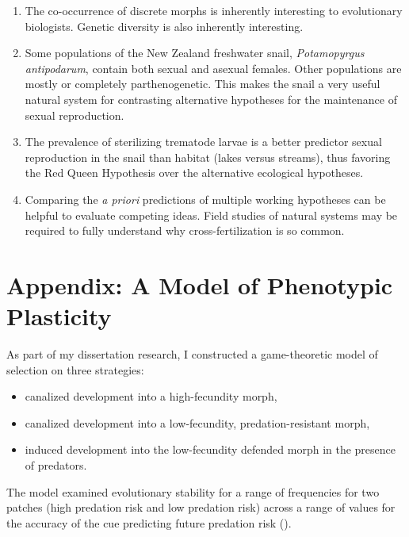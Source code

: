 \documentclass[
  american,
  letterpaper,
]{book}
\providecommand{\tightlist}{%
  \setlength{\itemsep}{0pt}\setlength{\parskip}{0pt}}\usepackage{longtable,booktabs,array}
\begin{document}
\begin{enumerate}
\def\labelenumi{\arabic{enumi}.}
\tightlist
\item
  The co-occurrence of discrete morphs is inherently interesting to
  evolutionary biologists. Genetic diversity is also inherently
  interesting.
\item
  Some populations of the New Zealand freshwater snail,
  \emph{Potamopyrgus antipodarum}, contain both sexual and asexual
  females. Other populations are mostly or completely parthenogenetic.
  This makes the snail a very useful natural system for contrasting
  alternative hypotheses for the maintenance of sexual reproduction.
\item
  The prevalence of sterilizing trematode larvae is a better predictor
  sexual reproduction in the snail than habitat (lakes versus streams),
  thus favoring the Red Queen Hypothesis over the alternative ecological
  hypotheses.
\item
  Comparing the \emph{a priori} predictions of multiple working
  hypotheses can be helpful to evaluate competing ideas. Field studies
  of natural systems may be required to fully understand why
  cross-fertilization is so common.
\end{enumerate}

\section{Appendix: A Model of Phenotypic Plasticity}\label{sec-app-3}

As part of my dissertation research, I constructed a game-theoretic
model of selection on three strategies:

\begin{itemize}
\tightlist
\item
  canalized development into a high-fecundity morph,
\item
  canalized development into a low-fecundity, predation-resistant morph,
\item
  induced development into the low-fecundity defended morph in the
  presence of predators.
\end{itemize}

The model examined evolutionary stability for a range of frequencies for
two patches (high predation risk and low predation risk) across a range
of values for the accuracy of the cue predicting future predation risk
().
\end{document}
